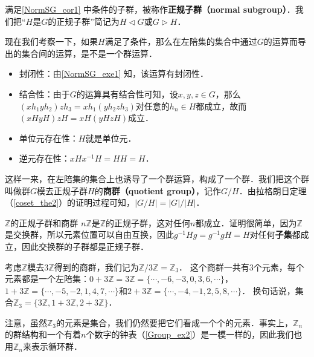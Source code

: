 满足\autoref{NormSG_cor1} 中条件的子群，被称作\textbf{正规子群（normal subgroup）}．我们把“$H$是$G$的正规子群”简记为$H\triangleleft G$或$G\triangleright H$．

现在我们考察一下，如果$H$满足了条件，那么在左陪集的集合中通过$G$的运算而导出的集合间的运算，是不是一个群运算．
\begin{itemize}
\item 封闭性：由\autoref{NormSG_exe1} 知，该运算有封闭性．
\item 结合性：由于$G$的运算具有结合性可知，设$x, y, z\in G$，那么$(xh_1yh_2)zh_3=xh_1(yh_2zh_3)$对任意的$h_n\in H$都成立，故而$(xHyH)zH=xH(yHzH)$成立．
\item 单位元存在性：$H$就是单位元．
\item 逆元存在性：$xHx^{-1}H=HH=H$．
\end{itemize}

这样一来，在左陪集的集合上也诱导了一个群运算，构成了一个群．我们把这个群叫做群$G$模去正规子群$H$的\textbf{商群（quotient group）}，记作$G/H$．由拉格朗日定理（\autoref{coset_the2}）的证明过程可知，$|G/H|={|G|}/{|H|}$．

\begin{example}{$\mathbb{Z}$的正规子群和商群}\label{NormSG_ex4}
$n\mathbb{Z}$是$\mathbb{Z}$的正规子群，这对任何$n$都成立．证明很简单，因为$\mathbb{Z}$是交换群，所以元素位置可以自由互换，因此$g^{-1}Hg=g^{-1}gH=H$对任何\textbf{子集}都成立，因此交换群的子群都是正规子群．

考虑$\mathbb{Z}$模去$3\mathbb{Z}$得到的商群，我们记为$\mathbb{Z}/3\mathbb{Z}=\mathbb{Z}_3$． 这个商群一共有$3$个元素，每个元素都是一个左陪集：$0+3\mathbb{Z}=3\mathbb{Z}=\{\cdots, -6, -3, 0, 3, 6, \cdots\}$，$1+3\mathbb{Z}=\{\cdots, -5, -2, 1, 4, 7, \cdots\}$和$2+3\mathbb{Z}=\{\cdots, -4, -1, 2, 5, 8, \cdots\}$． 换句话说，集合$\mathbb{Z}_3=\{3\mathbb{Z}, 1+3\mathbb{Z}, 2+3\mathbb{Z}\}$．

注意，虽然$\mathbb{Z}_3$的元素是集合，我们仍然要把它们看成一个个的元素．事实上，$\mathbb{Z}_n$的群结构和一个有着$n$个数字的钟表（\autoref{Group_ex2}）是一模一样的，因此我们也用$\mathbb{Z}_n$来表示循环群． 
\end{example}

